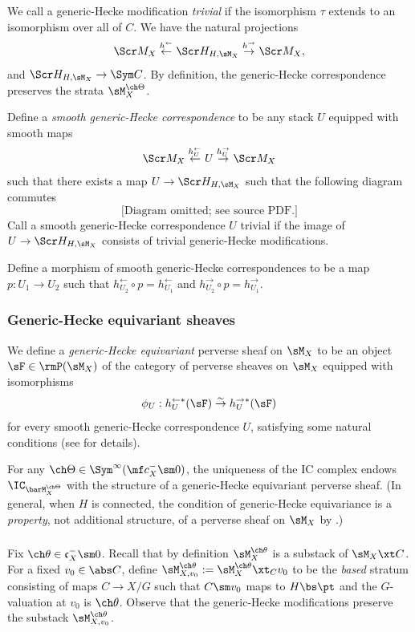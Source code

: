 We call a generic-Hecke modification \emph{trivial} if the isomorphism $\tau$
extends to an isomorphism over all of $C$.
We have the natural projections
\[ \Scr M_{X} \overset{h^\leftarrow}\leftarrow \Scr H_{H,\sM_X} \overset{h^\to}\to \Scr M_{X}, \]
and $\Scr H_{H,\sM_X} \to \Sym C$.
By definition, the generic-Hecke correspondence preserves the strata
$\sM_X^{\ch\Theta}$.

Define a \emph{smooth generic-Hecke correspondence} to be any stack $U$ equipped
with smooth maps
\[ \Scr M_{X} \overset{h^\leftarrow_U}\leftarrow U \overset{h^\to_U}\to \Scr M_{X} \]
such that there exists a map $U\to \Scr H_{H,\sM_X}$ such that
the following diagram commutes
\[
\text{[Diagram omitted; see source PDF.]}
\]
Call a smooth generic-Hecke correspondence $U$ trivial if the image of
$U \to \Scr H_{H,\sM_X}$ consists of trivial generic-Hecke modifications.

Define a morphism of smooth generic-Hecke correspondences to be a map
$p : U_1 \to U_2$
such that $h^\leftarrow_{U_2}\circ p = h^\leftarrow_{U_1}$ and $h^\to_{U_2}\circ p = h^\to_{U_1}$.

\subsubsection{Generic-Hecke equivariant sheaves}
We define a \emph{generic-Hecke equivariant} perverse sheaf on $\sM_X$
to be an object $\sF \in \rmP(\sM_X)$ of the category of perverse sheaves on $\sM_X$
equipped with isomorphisms
\[ \phi_U : h^{\leftarrow *}_U(\sF) \overset\sim\to h_U^{\rightarrow *}(\sF)
\]
for every smooth generic-Hecke correspondence $U$, satisfying some natural
conditions (see \cite[\S 2.3]{GN} for details).

For any $\ch\Theta \in \Sym^\infty(\mf c_X^- \sm 0)$,
the uniqueness of the IC complex endows $\IC_{\barM^{\ch\Theta}_X}$
with the structure of a generic-Hecke equivariant perverse sheaf.
(In general, when $H$ is connected, the condition of generic-Hecke equivariance
is a \emph{property}, not additional structure, of a perverse sheaf on $\sM_X$
by \cite[Proposition 3.5.2]{GN}.)

\subsubsection{}
Fix $\ch\theta \in \mathfrak c_X^- \sm 0$.
Recall that by definition $\sM_X^{\ch\theta}$ is a substack of $\sM_X \xt C$.
For a fixed $v_0 \in \abs C$, define $\sM_{X,v_0}^{\ch\theta} := \sM_X^{\ch\theta} \xt_C v_0$
to be the \emph{based} stratum consisting of maps $C \to X/G$ such that $C\sm v_0$
maps to $H\bs \pt$ and the $G$-valuation at $v_0$ is $\ch\theta$.
Observe that the generic-Hecke modifications preserve the substack
$\sM_{X,v_0}^{\ch\theta}$.

